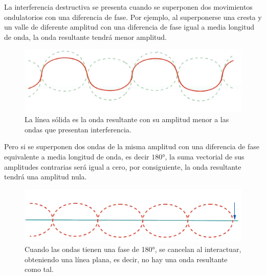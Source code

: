\documentclass[12pt, letter]{article}
\begin{document}
La interferencia destructiva se presenta cuando se superponen dos movimientos ondulatorios con una diferencia de fase. Por ejemplo, al superponerse una cresta y un valle de diferente amplitud con una diferencia de fase igual a media longitud de onda, la onda resultante tendrá menor amplitud.
\begin{figure}[H]
    \centering
    \includegraphics[scale=0.8]{Imagenes/Interferencia_Desctructiva_02.png}
    \caption{La línea sólida es la onda resultante con su amplitud menor a las ondas que presentan interferencia.}
\end{figure}
Pero si se superponen dos ondas de la misma amplitud con una diferencia de fase equivalente a media longitud de onda, es decir $\ang{180}$, la suma vectorial de sus amplitudes contrarias será igual a cero, por consiguiente, la onda resultante tendrá una amplitud nula.
\begin{figure}[H]
    \centering
    \includegraphics[scale=0.8]{Imagenes/Interferencia_Desctructiva_03.png}
    \caption{Cuando las ondas tienen una fase de \ang{180}, se cancelan al interactuar, obteniendo una línea plana, es decir, no hay una onda resultante como tal.}
\end{figure}



\end{document}
